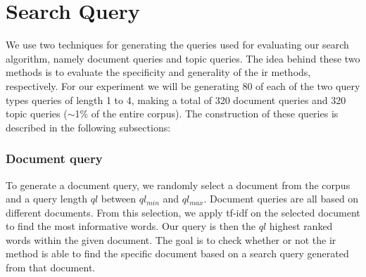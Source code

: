 \section{Search Query}\label{sec:query}

We use two techniques for generating the queries used for evaluating our search algorithm, namely document queries and topic queries.
The idea behind these two methods is to evaluate the specificity and generality of the \gls{ir} methods, respectively.
For our experiment we will be generating 80 of each of the two query types queries of length 1 to 4, making a total of 320 document queries and 320 topic queries ($\sim$1$\%$ of the entire corpus).
The construction of these queries is described in the following subsections:

\subsubsection{Document query}\label{subsec:query_gen_doc}
To generate a document query, we randomly select a document from the corpus and a query length $ql$ between $ql_{min}$ and $ql_{max}$.
Document queries are all based on different documents.
From this selection, we apply \gls{tf-idf} on the selected document to find the most informative words.
Our query is then the $ql$ highest ranked words within the given document.
The goal is to check whether or not the \gls{ir} method is able to find the specific document based on a search query generated from that document.

